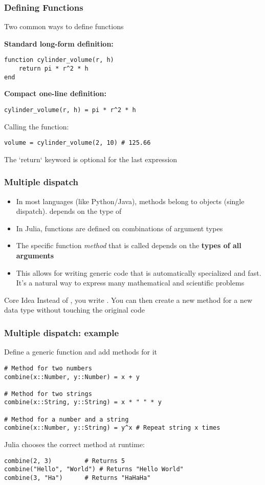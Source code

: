 \documentclass[aspectratio=169]{beamer}\usepackage[]{graphicx}\usepackage[]{xcolor}
\begin{document}
\begin{frame}[fragile]
  \frametitle{Defining Functions}
  Two common ways to define functions
  
  \textbf{Standard long-form definition:}
  \begin{lstlisting}
function cylinder_volume(r, h)
    return pi * r^2 * h
end\end{lstlisting}
  
  \vfill
  \textbf{Compact one-line definition:}
  \begin{lstlisting}
cylinder_volume(r, h) = pi * r^2 * h\end{lstlisting}
  
  \vfill
  Calling the function:
\begin{lstlisting}
volume = cylinder_volume(2, 10) # 125.66\end{lstlisting}
The `return` keyword is optional for the last expression
\end{frame}

\begin{frame}
  \frametitle{Multiple dispatch}
  \begin{itemize}
    \item In most languages (like Python/Java), methods belong to objects (single dispatch).  depends on the type of 
    \vfill
    \item In Julia, functions are defined on combinations of argument types
    \vfill
    \item The specific function \textit{method} that is called depends on the \textbf{types of all arguments}
    \vfill
    \item This allows for writing generic code that is automatically specialized and fast. It's a natural way to express many mathematical and scientific problems
  \end{itemize}
  \vfill
  \begin{exampleblock}{Core Idea}
  Instead of , you write . You can then create a new  method for a new data type without touching the original code
  \end{exampleblock}
\end{frame}

\begin{frame}[fragile]
  \frametitle{Multiple dispatch: example}
  Define a generic function  and add methods for it
  \begin{lstlisting}
# Method for two numbers
combine(x::Number, y::Number) = x + y

# Method for two strings
combine(x::String, y::String) = x * " " * y

# Method for a number and a string
combine(x::Number, y::String) = y^x # Repeat string x times\end{lstlisting}
  \vfill
  Julia chooses the correct method at runtime:
  \begin{lstlisting}
combine(2, 3)         # Returns 5
combine("Hello", "World") # Returns "Hello World"
combine(3, "Ha")      # Returns "HaHaHa"\end{lstlisting}
\end{frame}
\end{document}
